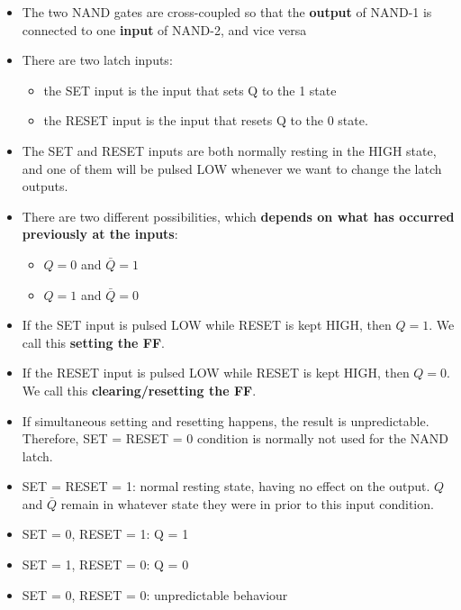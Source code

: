     \begin{itemize}
        \item The two NAND gates are cross-coupled so that the \textbf{output} of
        NAND-1 is connected to one \textbf{input} of NAND-2, and vice versa
        \item There are two latch inputs:
        \begin{itemize}
            \item the SET input is the input that sets Q to the 1 state
            \item the RESET input is the input that resets Q to the 0 state.
        \end{itemize}
        \item The SET and RESET inputs are both normally resting in the HIGH state,
        and one of them will be pulsed LOW whenever we want to change the latch
        outputs.
        \item There are two different possibilities, which \textbf{depends on what
        has occurred previously at the inputs}:
        \begin{itemize}
            \item $Q = 0$ and $\bar{Q} = 1$
            \item $Q = 1$ and $\bar{Q} = 0$
        \end{itemize}
    \end{itemize}

    \begin{itemize}
        \item If the SET input is pulsed LOW while RESET is kept HIGH, then $Q = 1$.
        We call this \textbf{setting the FF}.
        \item If the RESET input is pulsed LOW while RESET is kept HIGH, then $Q = 0$.
        We call this \textbf{clearing/resetting the FF}.
        \item If simultaneous setting and resetting happens, the result is unpredictable.
        Therefore, SET = RESET = 0 condition is normally not used for the NAND latch.
    \end{itemize}

    \begin{itemize}
        \item SET = RESET = 1: normal resting state, having no effect on the output.
        $Q$ and $\bar{Q}$ remain in whatever state they were in prior to this input
        condition.
        \item SET = 0, RESET = 1: Q = 1
        \item SET = 1, RESET = 0: Q = 0
        \item SET = 0, RESET = 0: unpredictable behaviour
    \end{itemize}

